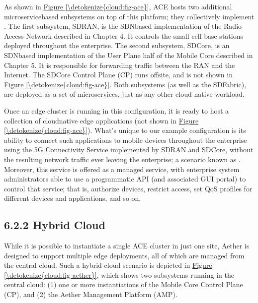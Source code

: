 \documentclass[a4paper,11pt,english]{sphinxmanual}
\begin{document}
\sphinxAtStartPar
As shown in \hyperref[\detokenize{cloud:fig-ace}]{Figure \ref{\detokenize{cloud:fig-ace}}}, ACE hosts two additional
microservice\sphinxhyphen{}based subsystems on top of this platform; they
collectively implement . The first subsystem, SD\sphinxhyphen{}RAN,
is the SDN\sphinxhyphen{}based implementation of the Radio Access Network described
in Chapter 4. It controls the small cell base stations deployed
throughout the enterprise. The second subsystem, SD\sphinxhyphen{}Core, is an
SDN\sphinxhyphen{}based implementation of the User Plane half of the Mobile Core
described in Chapter 5. It is responsible for forwarding traffic
between the RAN and the Internet. The SD\sphinxhyphen{}Core Control Plane (CP) runs
off\sphinxhyphen{}site, and is not shown in \hyperref[\detokenize{cloud:fig-ace}]{Figure \ref{\detokenize{cloud:fig-ace}}}. Both
subsystems (as well as the SD\sphinxhyphen{}Fabric), are deployed as a set of
microservices, just as any other cloud native workload.

\sphinxAtStartPar
Once an edge cluster is running in this configuration, it is ready to
host a collection of cloud\sphinxhyphen{}native edge applications (not shown in
\hyperref[\detokenize{cloud:fig-ace}]{Figure \ref{\detokenize{cloud:fig-ace}}}). What’s unique to our example
configuration is its ability to connect such applications to mobile
devices throughout the enterprise using the 5G Connectivity Service
implemented by SD\sphinxhyphen{}RAN and SD\sphinxhyphen{}Core, without the resulting network
traffic ever leaving the enterprise; a scenario known as . Moreover, this service is offered as a managed service,
with enterprise system administrators able to use a programmatic API
(and associated GUI portal) to control that service; that is,
authorize devices, restrict access, set QoS profiles for different
devices and applications, and so on.


\subsection{6.2.2 Hybrid Cloud}
\label{\detokenize{cloud:hybrid-cloud}}
\sphinxAtStartPar
While it is possible to instantiate a single ACE cluster in just one
site, Aether is designed to support multiple edge deployments, all of
which are managed from the central cloud. Such a hybrid cloud scenario
is depicted in \hyperref[\detokenize{cloud:fig-aether}]{Figure \ref{\detokenize{cloud:fig-aether}}}, which shows two
subsystems running in the central cloud: (1) one or more
instantiations of the Mobile Core Control Plane (CP), and (2) the
Aether Management Platform (AMP).
\end{document}
